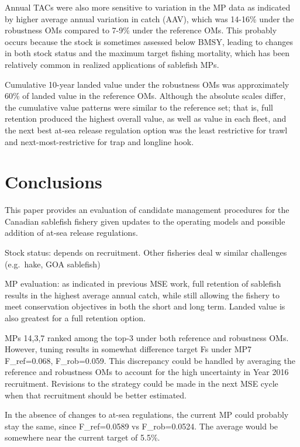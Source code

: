 \documentclass[11pt]{book}
\begin{document}
Annual TACs were also more sensitive to variation in the MP data as indicated by higher average annual variation in catch (AAV), which was 14-16\% under the robustness OMs compared to 7-9\% under the reference OMs. This probably occurs because the stock is sometimes assessed below BMSY, leading to changes in both stock status and the maximum target fishing mortality, which has been relatively common in realized applications of sablefish MPs.

Cumulative 10-year landed value under the robustness OMs was approximately 60\% of landed value in the reference OMs. Although the absolute scales differ, the cumulative value patterns were similar to the reference set; that is, full retention produced the highest overall value, as well as value in each fleet, and the next best at-sea release regulation option was the least restrictive for trawl and next-most-restrictive for trap and longline hook.

\hypertarget{conclusions}{%
\section{Conclusions}\label{conclusions}}

This paper provides an evaluation of candidate management procedures for the Canadian sablefish fishery given updates to the operating models and possible addition of at-sea release regulations.

Stock status: depends on recruitment. Other fisheries deal w similar challenges (e.g.~hake, GOA sablefish)

MP evaluation: as indicated in previous MSE work, full retention of sablefish results in the highest average annual catch, while still allowing the fishery to meet conservation objectives in both the short and long term. Landed value is also greatest for a full retention option.

MPs 14,3,7 ranked among the top-3 under both reference and robustness OMs. However, tuning results in somewhat difference target Fs under MP7 F\_ref=0.068, F\_rob=0.059. This discrepancy could be handled by averaging the reference and robustness OMs to account for the high uncertainty in Year 2016 recruitment. Revisions to the strategy could be made in the next MSE cycle when that recruitment should be better estimated.

In the absence of changes to at-sea regulations, the current MP could probably stay the same, since F\_ref=0.0589 vs F\_rob=0.0524. The average would be somewhere near the current target of 5.5\%.
\end{document}
